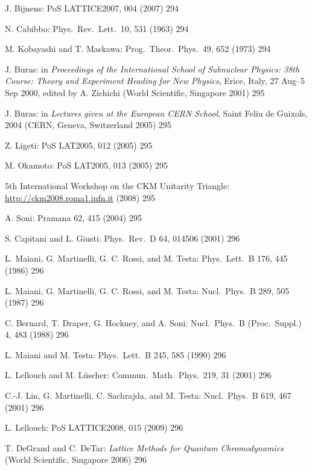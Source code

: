 \begin{enumerate}[label={[\arabic*]}]
  \item J. Bijnens: PoS LATTICE2007, 004 (2007) 294
  \item N. Cabibbo: Phys.\ Rev.\ Lett.\ 10, 531 (1963) 294
  \item M. Kobayashi and T. Maskawa: Prog.\ Theor.\ Phys.\ 49, 652 (1973) 294
  \item J. Buras: in \emph{Proceedings of the International School of Subnuclear Physics: 38th Course: Theory and Experiment Heading for New Physics}, Erice, Italy, 27 Aug--5 Sep 2000, edited by A. Zichichi (World Scientific, Singapore 2001) 295
  \item J. Buras: in \emph{Lectures given at the European CERN School}, Saint Feliu de Guixols, 2004 (CERN, Geneva, Switzerland 2005) 295
  \item Z. Ligeti: PoS LAT2005, 012 (2005) 295
  \item M. Okamoto: PoS LAT2005, 013 (2005) 295
  \item 5th International Workshop on the CKM Unitarity Triangle: \url{http://ckm2008.roma1.infn.it} (2008) 295
  \item A. Soni: Pramana 62, 415 (2004) 295
  \item S. Capitani and L. Giusti: Phys.\ Rev.\ D 64, 014506 (2001) 296
  \item L. Maiani, G. Martinelli, G. C. Rossi, and M. Testa: Phys.\ Lett.\ B 176, 445 (1986) 296
  \item L. Maiani, G. Martinelli, G. C. Rossi, and M. Testa: Nucl.\ Phys.\ B 289, 505 (1987) 296
  \item C. Bernard, T. Draper, G. Hockney, and A. Soni: Nucl.\ Phys.\ B (Proc.\ Suppl.) 4, 483 (1988) 296
  \item L. Maiani and M. Testa: Phys.\ Lett.\ B 245, 585 (1990) 296
  \item L. Lellouch and M. L\"uscher: Commun.\ Math.\ Phys.\ 219, 31 (2001) 296
  \item C.-J. Lin, G. Martinelli, C. Sachrajda, and M. Testa: Nucl.\ Phys.\ B 619, 467 (2001) 296
  \item L. Lellouch: PoS LATTICE2008, 015 (2009) 296
  \item T. DeGrand and C. DeTar: \emph{Lattice Methods for Quantum Chromodynamics} (World Scientific, Singapore 2006) 296
\end{enumerate}
